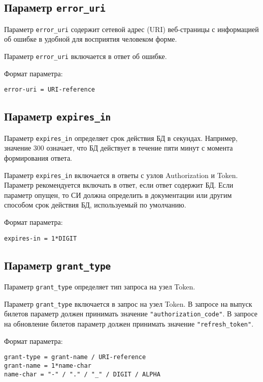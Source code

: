 \subsection{Параметр \lstinline{error_uri}}\label{PARAMS.ErrorUri}

Параметр \lstinline{error_uri} содержит сетевой адрес (URI) веб-страницы 
с информацией об ошибке в удобной для восприятия человеком форме.

Параметр \lstinline{error_uri} включается в ответ об ошибке.


Формат параметра:
\begin{lstlisting}
error-uri = URI-reference
\end{lstlisting}

\subsection{Параметр \lstinline{expires_in}}\label{PARAMS.ExpiresIn}

Параметр \lstinline{expires_in} определяет срок действия БД в секундах. 
%
Например, значение 300 означает, что БД действует в течение пяти минут с момента 
формирования ответа.

Параметр \lstinline{expires_in} включается в ответы с узлов Authorization и 
Token. 
%
Параметр рекомендуется включать в ответ, если ответ содержит БД.  
%
Если параметр опущен, то СИ должна определить в документации или другим способом
срок действия БД, используемый по умолчанию.

Формат параметра:
\begin{lstlisting}
expires-in = 1*DIGIT
\end{lstlisting}

\subsection{Параметр \lstinline{grant_type}}\label{PARAMS.GrantType}

Параметр \lstinline{grant_type} определяет тип запроса на узел Token.

Параметр \lstinline{grant_type} включается в запрос на узел Token.
%
В запросе на выпуск билетов параметр должен принимать значение 
\lstinline{"authorization_code"}.
%
В запросе на обновление билетов параметр должен принимать значение 
\lstinline{"refresh_token"}.

Формат параметра:
\begin{lstlisting}
grant-type = grant-name / URI-reference
grant-name = 1*name-char
name-char = "-" / "." / "_" / DIGIT / ALPHA
\end{lstlisting}

